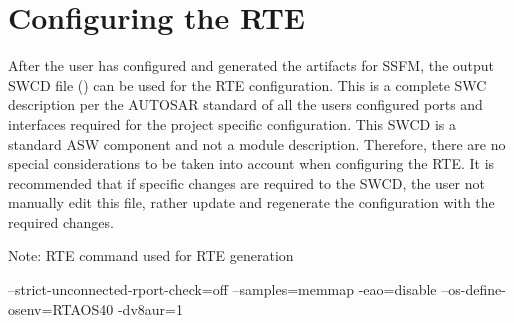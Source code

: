 \section{Configuring the RTE}
After the user has configured and generated the artifacts for SSFM, the output SWCD file \linebreak() can be used for the RTE configuration.
This is a complete SWC description per the AUTOSAR standard of all the users configured ports and interfaces required for the project specific configuration.
This SWCD is a standard ASW component and not a module description.
Therefore, there are no special considerations to be taken into account when configuring the RTE.
It is recommended that if specific changes are required to the SWCD, the user not manually edit this file, rather update and regenerate the configuration with the required changes.

Note: RTE command used for RTE generation

\begin{rtecommandline}
--strict-unconnected-rport-check=off --samples=memmap -eao=disable --os-define-osenv=RTAOS40 -dv8aur=1
\end{rtecommandline}